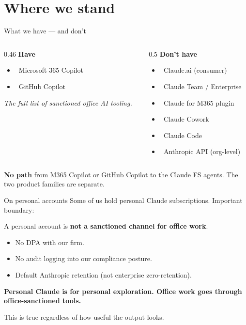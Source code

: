 \documentclass[11pt,aspectratio=169]{beamer}
\newcommand{\good}{\textcolor{successgreen}{\checkmark}}
\newcommand{\bad}{\textcolor{warningred}{\textbf{\texttimes}}}
\newcommand{\hl}[1]{\textbf{\textcolor{accentpurple}{#1}}}
\begin{document}
\section{Where we stand}

\begin{frame}{What we have --- and don't}
  \begin{columns}[T,onlytextwidth]
    \begin{column}{0.46\textwidth}
      \textbf{Have} \medskip
      \begin{itemize}
        \item \good\ Microsoft 365 Copilot
        \item \good\ GitHub Copilot
      \end{itemize}
      \medskip
      \footnotesize\textit{The full list of sanctioned office AI tooling.}
    \end{column}
    \begin{column}{0.5\textwidth}
      \textbf{Don't have} \medskip
      \begin{itemize}
        \footnotesize
        \item \bad\ Claude.ai (consumer)
        \item \bad\ Claude Team / Enterprise
        \item \bad\ Claude for M365 plugin
        \item \bad\ Claude Cowork
        \item \bad\ Claude Code
        \item \bad\ Anthropic API (org-level)
      \end{itemize}
    \end{column}
  \end{columns}

  \vfill
  \hl{No path} from M365 Copilot or GitHub Copilot to the Claude FS agents. The two product families are separate.
\end{frame}

\begin{frame}{On personal accounts}
  Some of us hold personal Claude subscriptions. Important boundary:

  \vfill
  \begin{exampleblock}{}
    A personal account is \hl{not a sanctioned channel for office work}.
    \medskip
    \begin{itemize}
      \item No DPA with our firm.
      \item No audit logging into our compliance posture.
      \item Default Anthropic retention (not enterprise zero-retention).
    \end{itemize}
    \medskip
    \textbf{Personal Claude is for personal exploration. Office work goes through office-sanctioned tools.}
  \end{exampleblock}

  \vfill
  This is true regardless of how useful the output looks.
\end{frame}
\end{document}
